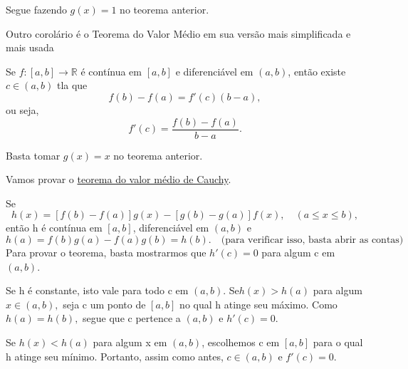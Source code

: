\documentclass[analysis_notes.tex]{subfiles}
\begin{document}
\begin{proof*}
	Segue fazendo \(g(x) = 1\) no teorema anterior. \qedsymbol
\end{proof*}
Outro corolário é o Teorema do Valor Médio em sua versão mais simplificada e mais usada
\hypertarget{mean_value}{
	\begin{crl*}
		Se \(f:[a, b]\rightarrow \mathbb{R}\) é contínua em \([a, b]\) e diferenciável em
		\((a, b)\), então existe \(c\in (a, b)\) tla que
		\[
			f(b) - f(a) = f'(c)(b-a),
		\]
		ou seja,
		\[
			f'(c) = \frac{f(b)-f(a)}{b-a}.
		\]
	\end{crl*}}
\begin{proof*}
	Basta tomar \(g(x) = x\) no teorema anterior. \qedsymbol
\end{proof*}
Vamos provar o \hyperlink{cauchy_mvt}{teorema do valor médio de Cauchy}.
\begin{proof*}
	Se
	\[
		h(x) = [f(b)-f(a)]g(x) - [g(b)-g(a)]f(x),\quad (a\leq x\leq b),
	\]
	então h é contínua em \([a, b]\), diferenciável em \((a, b)\) e
	\[
		h(a) = f(b)g(a) - f(a)g(b) = h(b).\quad \text{(para verificar isso, basta abrir as contas)}
	\]
	Para provar o teorema, basta mostrarmos que \(h'(c) = 0\) para algum c em \((a, b)\).

	Se h é constante, isto vale para todo c em \((a, b).\)
	Se\(h(x) > h(a)\) para algum \( x\in (a, b),\) seja c um ponto de \([a, b]\)
	no qual h atinge seu máximo. Como \(h(a) = h(b),\) segue que c pertence a \((a, b)\) e \(h'(c) = 0\).

	Se \(h(x) < h(a)\) para algum x em \((a, b)\), escolhemos c em \([a, b]\)
	para o qual h atinge seu mínimo. Portanto, assim como antes, \(c\in (a, b)\) e
	\(f'(c) = 0.\) \qedsymbol
\end{proof*}
\end{document}
